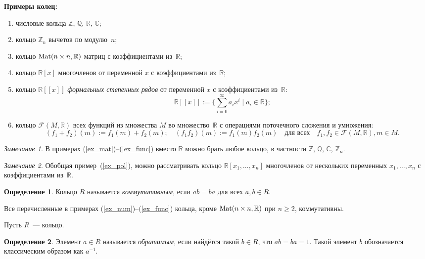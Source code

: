 \documentclass[a4paper,10pt]{amsart}
\def\Mat{{\rm Mat}}%
\def\CC{{\mathbb C}}%
\def\ZZ{{\mathbb Z}}%
\def\RR{{\mathbb R}}%
\def\QQ{{\mathbb Q}}%
\def\FFF{\mathcal{F}}
\def\Mat{{\rm Mat}}
\theoremstyle{definition}
\newtheorem{definition}{Определение}
\theoremstyle{remark}
\newtheorem{remark}{Замечание}
\begin{document}
\textbf{Примеры колец:}
\begin{enumerate}[label=\textup{(\arabic*)},ref=\textup{\arabic*}]
\item \label{ex_num}
числовые кольца $\ZZ$, $\QQ$, $\RR$, $\CC$;

\item
кольцо $\ZZ_n$ вычетов по модулю~$n$;

\item \label{ex_mat}
кольцо $\Mat(n\times n, \RR)$ матриц с коэффициентами из~$\RR$;

\item \label{ex_pol}
кольцо $\RR[x]$ многочленов от переменной $x$ с коэффициентами
из~$\RR$;

\item
кольцо $\RR[[x]]$ \textit{формальных степенных рядов} от переменной
$x$ с коэффициентами из~$\RR$:
$$
\RR[[x]] := \lbrace \sum \limits_{i = 0}^\infty a_i x^i \mid a_i \in
\RR \rbrace;
$$

\item \label{ex_func}
кольцо $\FFF(M, \RR)$ всех функций из множества $M$ во
множество~$\RR$ с операциями поточечного сложения и умножения:
$$
(f_1 + f_2)(m) := f_1(m) + f_2(m); \quad (f_1f_2)(m) := f_1(m)
f_2(m) \quad \text{для всех} \quad f_1,f_2 \in \FFF(M, \RR), m \in
M.
$$
\end{enumerate}

\begin{remark}
В примерах (\ref{ex_mat})--(\ref{ex_func}) вместо $\RR$ можно брать
любое кольцо, в частности $\ZZ$, $\QQ$, $\CC$, $\ZZ_n$.
\end{remark}

\begin{remark}
Обобщая пример~(\ref{ex_pol}), можно рассматривать кольцо $\RR[x_1,
\ldots, x_n]$ многочленов от нескольких переменных $x_1, \ldots,
x_n$ с коэффициентами из~$\RR$.
\end{remark}

\begin{definition}
Кольцо $R$ называется {\it коммутативным}, если $ab=ba$ для всех
$a,b\in R$.
\end{definition}

Все перечисленные в примерах (\ref{ex_num})--(\ref{ex_func}) кольца,
кроме $\Mat(n\times n, \RR)$ при $n \geqslant 2$, коммутативны.

Пусть $R$~--- кольцо.

\begin{definition}
Элемент $a\in R$ называется {\it обратимым}, если найдётся такой
$b\in R$, что $ab=ba=1$. Такой элемент $b$ обозначается классическим образом как $a^{-1}$.
\end{definition}
\end{document}
